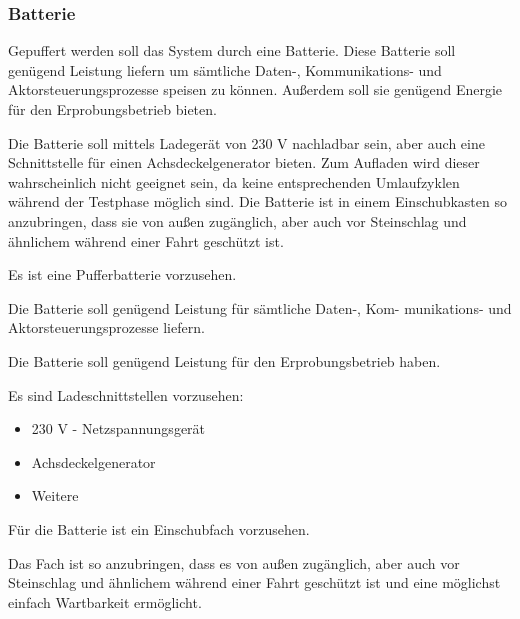 \subsubsection{Batterie}
Gepuffert werden soll das System durch eine Batterie. Diese Batterie soll genügend Leistung liefern um sämtliche Daten-, Kommunikations- und Aktorsteuerungsprozesse speisen zu können. Außerdem soll sie genügend Energie für den Erprobungsbetrieb bieten.\par
Die Batterie soll mittels Ladegerät von 230 V nachladbar sein, aber auch eine Schnittstelle für einen Achsdeckelgenerator bieten. Zum Aufladen wird dieser wahrscheinlich nicht geeignet sein, da keine entsprechenden Umlaufzyklen während der Testphase möglich sind. %
Die Batterie ist in einem Einschubkasten so anzubringen, dass sie von außen zugänglich, aber auch vor Steinschlag und ähnlichem während einer Fahrt geschützt ist.\par
\begin{feat}
Es ist eine Pufferbatterie vorzusehen.
\end{feat}
\begin{rem}[zu Anf. 11]
Die Batterie soll genügend Leistung für sämtliche Daten-, Kom- munikations- und Aktorsteuerungsprozesse liefern.
\end{rem}
\begin{rem}[zu Anf. 11]
Die Batterie soll genügend Leistung für den Erprobungsbetrieb haben.
\end{rem}
\begin{rem}[zu Anf. 11]
Es sind Ladeschnittstellen vorzusehen:
\begin{itemize}
    \item 230 V - Netzspannungsgerät
    \item Achsdeckelgenerator
    \item Weitere
\end{itemize}
\end{rem}
\begin{feat}
Für die Batterie ist ein Einschubfach vorzusehen. 
\end{feat}
\begin{rem} [zu Anf. 12]
Das Fach ist so anzubringen, dass es von außen zugänglich, aber auch vor Steinschlag und ähnlichem während einer Fahrt geschützt ist und eine möglichst einfach Wartbarkeit ermöglicht.
\end{rem}

